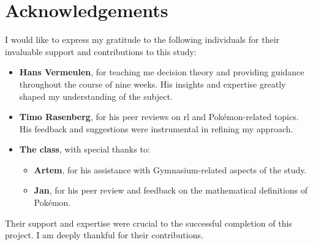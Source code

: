 \section*{Acknowledgements}

I would like to express my gratitude to the following individuals for their invaluable support and contributions to this study:

\begin{itemize}
    \item \textbf{Hans Vermeulen}, for teaching me decision theory and providing guidance throughout the course of nine weeks. His insights and expertise greatly shaped my understanding of the subject.
    \item \textbf{Timo Rasenberg}, for his peer reviews on \gls{rl} and Pokémon-related topics. His feedback and suggestions were instrumental in refining my approach.
    \item \textbf{The class}, with special thanks to:
    \begin{itemize}
        \item \textbf{Artem}, for his assistance with Gymnasium-related aspects of the study.
        \item \textbf{Jan}, for his peer review and feedback on the mathematical definitions of Pokémon.
    \end{itemize}
\end{itemize}

Their support and expertise were crucial to the successful completion of this project. I am deeply thankful for their contributions.
